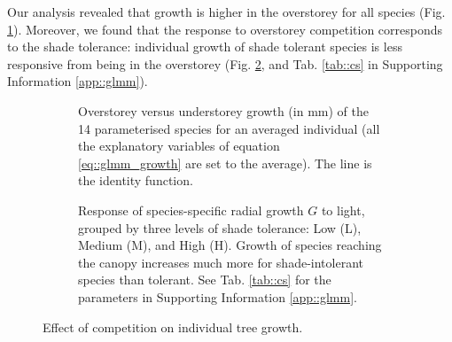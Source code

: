 Our analysis revealed that growth is higher in the overstorey for all species (Fig. \ref{fig::over_under}). Moreover, we found that the response to overstorey competition corresponds to the shade tolerance: individual growth of shade tolerant species is less responsive from being in the overstorey (Fig. \ref{fig::groups}, and Tab. \ref{tab::cs} in Supporting Information \ref{app::glmm}).
\begin{figure}
\begin{subfigure}[t]{.48\textwidth}
	\centering
	
	\caption{Overstorey versus understorey growth (in mm) of the 14 parameterised species for an averaged individual (\ie all the explanatory variables of equation \eqref{eq::glmm_growth} are set to the average). The line is the identity function.}
	\label{fig::over_under}
\end{subfigure}
\hfill
\begin{subfigure}[t]{.48\textwidth}
	\centering
	
	\caption{Response of species-specific radial growth $ G $ to light, grouped by three levels of shade tolerance: Low (L), Medium (M), and High (H). Growth of species reaching the canopy increases much more for shade-intolerant species than tolerant. See Tab. \ref{tab::cs} for the parameters in Supporting Information \ref{app::glmm}.}
	\label{fig::groups}
\end{subfigure}
\caption{Effect of competition on individual tree growth.}
\label{fig::growthResults}
\end{figure}

